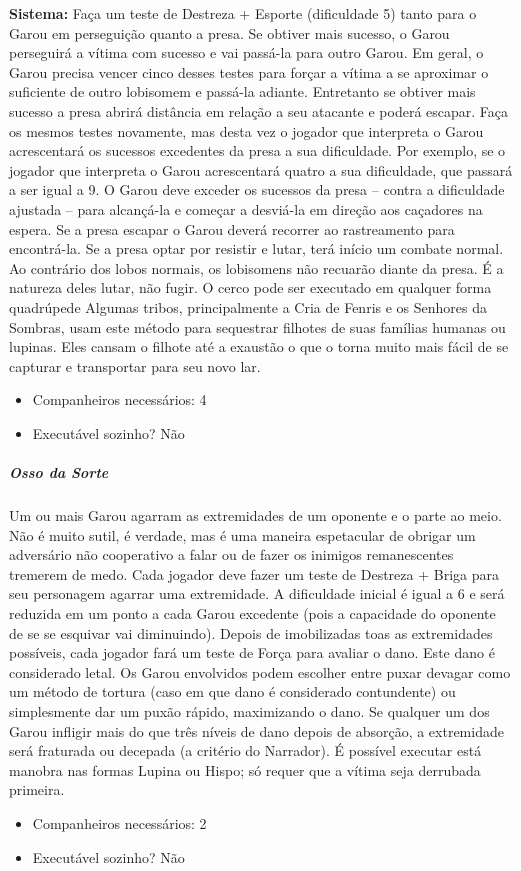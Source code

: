 \begin{multicols}{2}
\textbf{Sistema:} Faça um teste de Destreza + Esporte (dificuldade 5) tanto para o Garou em perseguição quanto a presa.  Se obtiver mais sucesso, o Garou perseguirá a vítima com sucesso e vai passá-la para outro Garou. Em geral, o Garou precisa vencer cinco desses testes para forçar a vítima a se aproximar o suficiente de outro lobisomem e passá-la adiante.
Entretanto se obtiver mais sucesso a presa abrirá distância em relação a seu atacante e poderá escapar. Faça os mesmos testes novamente, mas desta vez o jogador que interpreta o Garou acrescentará os sucessos excedentes da presa a sua dificuldade. Por exemplo, se o jogador que interpreta o Garou acrescentará quatro a sua dificuldade, que passará a ser igual a 9. O Garou deve exceder os sucessos da presa – contra a dificuldade ajustada – para alcançá-la e começar a desviá-la em direção aos caçadores na espera. Se a presa escapar o Garou deverá recorrer ao rastreamento para encontrá-la.
Se a presa optar por resistir e lutar, terá início um combate normal.  Ao contrário dos lobos normais, os lobisomens não recuarão diante da presa. É a natureza deles lutar, não fugir.
O cerco pode ser executado em qualquer forma quadrúpede Algumas tribos, principalmente a Cria de Fenris e os Senhores da Sombras, usam este método para sequestrar filhotes de suas famílias humanas ou lupinas. Eles cansam o filhote até a exaustão o que o torna muito mais fácil de se capturar e transportar para seu novo lar.
\begin{itemize}[noitemsep]
\item Companheiros necessários: 4 
\item Executável sozinho? Não
\end{itemize}

\subparagraph{\textbf{Osso da Sorte}}
Um ou mais Garou agarram as extremidades de um oponente e o parte ao meio. Não é muito sutil, é verdade, mas é uma maneira espetacular de obrigar um adversário não cooperativo a falar ou de fazer os inimigos remanescentes tremerem de medo. 
Cada jogador deve fazer um teste de Destreza + Briga para seu personagem agarrar uma extremidade. A dificuldade inicial é igual a 6 e será reduzida em um ponto a cada Garou excedente (pois a capacidade do oponente de se se esquivar vai diminuindo). Depois de imobilizadas toas as extremidades possíveis, cada jogador fará um teste de Força para avaliar o dano. Este dano é considerado letal. Os Garou envolvidos podem escolher entre puxar devagar como um método de tortura (caso em que dano é considerado contundente) ou simplesmente dar um puxão rápido, maximizando o dano. Se qualquer um dos Garou infligir mais do que três níveis de dano depois de absorção, a extremidade será fraturada ou decepada (a critério do Narrador). 
É possível executar está manobra nas formas Lupina ou Hispo; só requer que a vítima seja derrubada primeira. 
\begin{itemize}[noitemsep]
\item Companheiros necessários: 2 
\item Executável sozinho? Não
\end{itemize}


\end{multicols}
